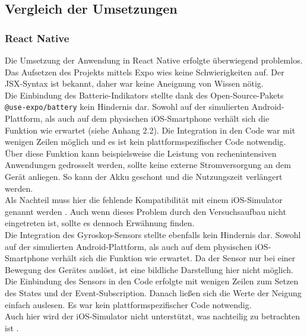 \documentclass[a4paper]{scrartcl}
\begin{document}
 \newpage
 
\subsection{Vergleich der Umsetzungen}

\subsubsection{React Native}

Die Umsetzung der Anwendung in React Native erfolgte überwiegend problemlos. Das Aufsetzen des Projekts mittels Expo wies keine Schwierigkeiten auf. Der JSX-Syntax ist bekannt, daher war keine Aneignung von Wissen nötig. \\

Die Einbindung des Batterie-Indikators stellte dank des Open-Source-Pakets \texttt{@use-expo/battery} kein Hindernis dar. Sowohl auf der simulierten Android-Plattform, als auch auf dem physischen iOS-Smartphone verhält sich die Funktion wie erwartet (siehe Anhang 2.2). Die Integration in den Code war mit wenigen Zeilen möglich und es ist kein plattformspezifischer Code notwendig. Über diese Funktion kann beispielsweise die Leistung von rechenintensiven Anwendungen gedrosselt werden, sollte keine externe Stromversorgung an dem Gerät anliegen. So kann der Akku geschont und die Nutzungszeit verlängert werden. \\
Als Nachteil muss hier die fehlende Kompatibilität mit einem iOS-Simulator genannt werden \autocite{Expo_battery}. Auch wenn dieses Problem durch den Versuchsaufbau nicht eingetreten ist, sollte es dennoch Erwähnung finden. \\

Die Integration des Gyroskop-Sensors stellte ebenfalls kein Hindernis dar. Sowohl auf der simulierten Android-Plattform, als auch auf dem physischen iOS-Smartphone verhält sich die Funktion wie erwartet. Da der Sensor nur bei einer Bewegung des Gerätes auslöst, ist eine bildliche Darstellung hier nicht möglich. Die Einbindung des Sensors in den Code erfolgte mit wenigen Zeilen zum Setzen des States und der Event-Subscription. Danach ließen sich die Werte der Neigung einfach auslesen. Es war kein plattformspezifischer Code notwendig. \\
Auch hier wird der iOS-Simulator nicht unterstützt, was nachteilig zu betrachten ist \autocite{Expo_gyroscope}. \\
\end{document}
